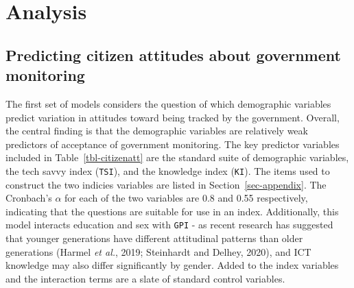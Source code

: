 \documentclass[
  letterpaper,
  DIV=11,
  numbers=noendperiod]{scrartcl}
\begin{document}
\section{Analysis}\label{sec-analysis}

\subsection{Predicting citizen attitudes about government
monitoring}\label{predicting-citizen-attitudes-about-government-monitoring}

The first set of models considers the question of which demographic
variables predict variation in attitudes toward being tracked by the
government. Overall, the central finding is that the demographic
variables are relatively weak predictors of acceptance of government
monitoring. The key predictor variables included in
Table~\ref{tbl-citizenatt} are the standard suite of demographic
variables, the tech savvy index (\texttt{TSI}), and the knowledge index
(\texttt{KI}). The items used to construct the two indicies variables
are listed in Section~\ref{sec-appendix}. The Cronbach's \(\alpha\) for
each of the two variables are 0.8 and 0.55 respectively, indicating that
the questions are suitable for use in an index. Additionally, this model
interacts education and sex with \texttt{GPI} - as recent research has
suggested that younger generations have different attitudinal patterns
than older generations (Harmel \emph{et al.}, 2019; Steinhardt and
Delhey, 2020), and ICT knowledge may also differ significantly by
gender. Added to the index variables and the interaction terms are a
slate of standard control variables.
\end{document}
